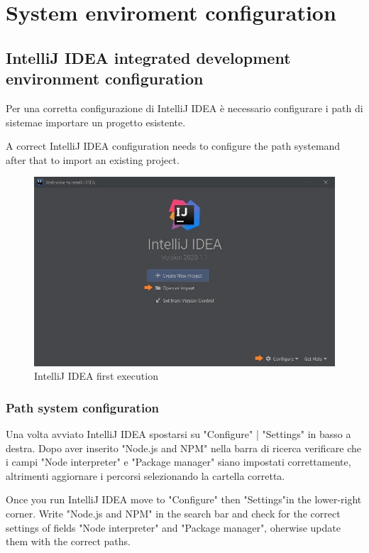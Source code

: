 \section{System enviroment configuration}
	\subsection{IntelliJ IDEA integrated development environment configuration}
	Per una corretta configurazione di IntelliJ IDEA è necessario configurare i path di sistema\glo e importare un progetto esistente.
	
	A correct IntelliJ IDEA configuration needs to configure the path system\glo and after that to import an existing project.
	
	\begin{figure}[H]
		\centering
		\includegraphics[scale=0.70]{../Developer_manual/img/intellijidea_main.jpg}
		\caption{IntelliJ IDEA first execution}
	\end{figure}	

	

	\subsubsection{Path system configuration}
	Una volta avviato IntelliJ IDEA spostarsi su "Configure" | "Settings" in basso a destra. Dopo aver inserito "Node.js and NPM" nella barra di ricerca verificare che i campi "Node interpreter" e "Package manager" siano impostati correttamente, altrimenti aggiornare i percorsi selezionando la cartella corretta.
	
	Once you run IntelliJ IDEA move to "Configure" then "Settings"in the lower-right corner. Write "Node.js and NPM" in the search bar and check for the correct settings of fields "Node interpreter" and "Package manager", oherwise update them with the correct paths. 

